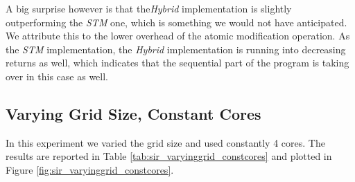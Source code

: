 A big surprise however is that the\textit{Hybrid} implementation is slightly outperforming the \textit{STM} one, which is something we would not have anticipated. We attribute this to the lower overhead of the atomic modification operation. As the \textit{STM} implementation, the \textit{Hybrid} implementation is running into decreasing returns as well, which indicates that the sequential part of the program is taking over in this case as well.


\subsection{Varying Grid Size, Constant Cores}
In this experiment we varied the grid size and used constantly 4 cores. %
The results are reported in Table \ref{tab:sir_varyinggrid_constcores} and plotted in Figure \ref{fig:sir_varyinggrid_constcores}.

